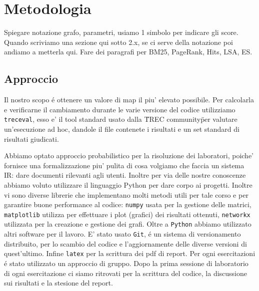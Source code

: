 \section{Metodologia}
\label{sec:metodologia}

Spiegare notazione grafo, parametri, usiamo 1 simbolo per indicare gli score. Quando scriviamo una sezione qui sotto 2.x, se ci serve della notazione poi andiamo a metterla qui. 
Fare dei paragrafi per BM25, PageRank, Hits, LSA, ES.


\subsection{Approccio}
\label{sec:approccio}

Il nostro scopo \'e ottenere un valore di map il piu' elevato possibile. Per calcolarla e verificarne il cambiamento durante le varie versione del codice utilizziamo \texttt{treceval}, esso e' il tool standard usato dalla \"TREC community\" per valutare un'esecuzione ad hoc, dandole il file contenete i risultati e un set standard di risultati giudicati.  

Abbiamo optato approccio probabilistico per la risoluzione dei laboratori, poiche' fornisce una formalizzazione piu' pulita di cosa volgiamo che faccia un sistema IR: dare documenti rilevanti agli utenti. 
Inoltre per via delle nostre conoscenze abbiamo voluto utilizzare il linguaggio Python per dare corpo ai progetti. Inoltre vi sono diverse librerie che implementano molti metodi utili per tale corso e per garantire buone performance al codice: \texttt{numpy} usata per la gestione delle matrici, \texttt{matplotlib} utilizza per effettuare i plot (grafici) dei risultati ottenuti, \texttt{networkx} utilizzata per la creazione e gestione dei grafi.
Oltre a \texttt{Python} abbiamo utilizzato altri software per il lavoro. E' stato usato \texttt{Git}, \'e un sistema di versionamento distribuito, per lo scambio del codice e l'aggiornamente delle diverse versioni di quest'ultimo. Infine \texttt{latex} per la scrittura dei pdf di report.
Per ogni esercitazioni \'e stato utilizzato un approccio di gruppo. Dopo la prima sessione di laboratorio di ogni esercitazione ci siamo ritrovati per la scrittura del codice, la discussione sui risultati e la stesione del report.

